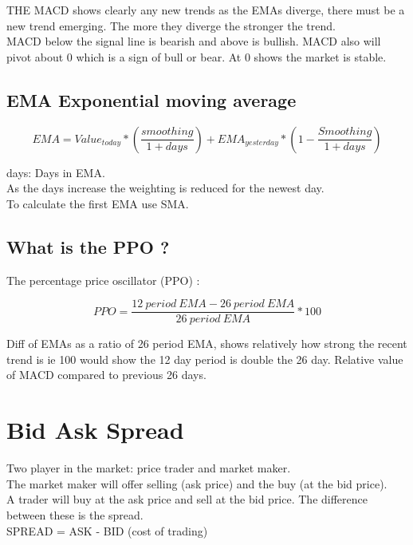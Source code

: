 \documentclass[11pt]{scrartcl} %
\begin{document}
THE MACD shows clearly any new trends as the EMAs diverge, there must be a new trend emerging. The 
more they diverge the stronger the trend.\\

MACD below the signal line is bearish and above is bullish. MACD also will pivot about 0 which is a sign
of bull or bear. At 0 shows the market is stable.

\subsection{EMA Exponential moving average}

\[ EMA = Value_{today} *(\frac{smoothing}{1 + days}) + EMA_{yesterday}*(1-\frac{Smoothing}{1+days}) \]

days: Days in EMA.\\

As the days increase the weighting is reduced for the newest day.\\

To calculate the first EMA use SMA.

\subsection{What is the PPO ?}

The percentage price oscillator (PPO) :

\[ PPO = \frac{12\:period\:EMA - 26\:period\:EMA}{26\:period\:EMA} *100 \]

Diff of EMAs as a ratio of 26 period EMA, shows relatively how strong the recent trend is ie 100 would
show the 12 day period is double the 26 day. Relative value of MACD compared to previous 26 days.

\section{Bid Ask Spread}

Two player in the market: price trader and market maker.\\

The market maker will offer selling (ask price) and the buy (at the bid price).\\

A trader will buy at the ask price and sell at the bid price. The difference between these is the
spread.\\

SPREAD = ASK - BID (cost of trading)
\end{document}
